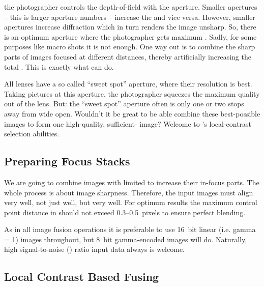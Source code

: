 %
\noindent the photographer controls the depth-of-field with the aperture.  Smaller apertures --
this is larger aperture numbers -- increase the  and vice versa.  However, smaller
apertures increase diffraction which in turn renders the image unsharp.  So, there is an optimum
aperture where the photographer gets maximum .  Sadly, for some purposes like macro
shots it is not enough.  One way out is to combine the sharp parts of images focused at
different distances, thereby artificially increasing the total .  This is exactly
what \App{} can do.

%
%
All lenses have a so called ``sweet spot'' aperture, where their resolution is best.  Taking
pictures at this aperture, the photographer squeezes the maximum quality out of the lens.  But:
the ``sweet spot'' aperture often is only one or two stops away from wide open.  Wouldn't it be
great to be able combine these best-possible images to form one high-quality,
sufficient- image?  Welcome to \App{}'s local-contrast selection abilities.


\subsection[Preparing Focus Stacks]{\label{sec:preparing-focus-stacks}%
  Preparing Focus Stacks}

We are going to combine images with limited  to increase their in-focus parts.  The
whole process is about image sharpness.  Therefore, the input images must align very well, not
just well, but very well.  For optimum results the maximum control point distance in
 should not exceed 0.3--0.5~pixels to ensure perfect blending.

%
%
As in all image fusion operations it is preferable to use 16~bit linear (i.e. gamma = 1) images
throughout, but 8~bit gamma-encoded images will do.  Naturally, high signal-to-noise
() ratio input data always is welcome.


\subsection[Local Contrast Based Fusing]{\label{sec:local-contrast-based-fusing}%
  Local Contrast Based Fusing}

